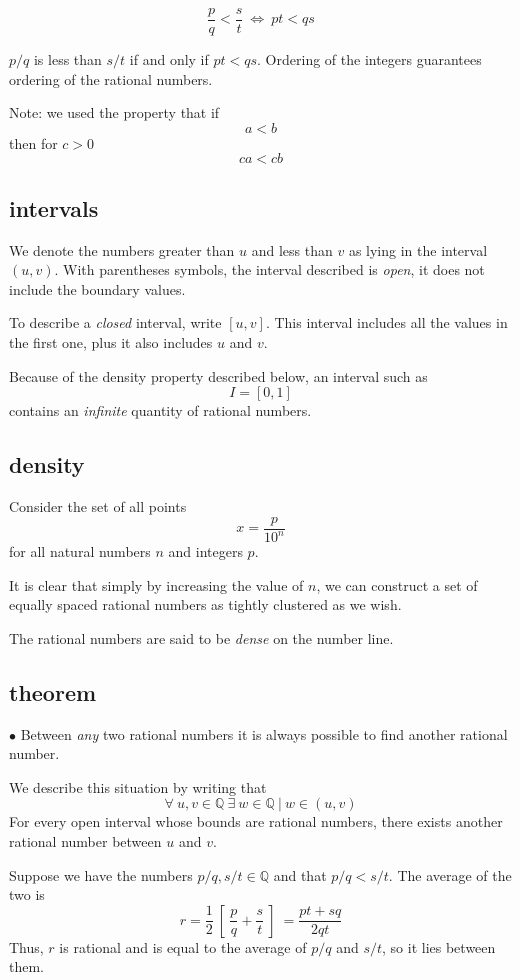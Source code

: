 \documentclass[11pt, oneside]{article}
\begin{document}
\[ \frac{p}{q} < \frac{s}{t} \ \iff \ pt < qs \]

$p/q$ is less than $s/t$ if and only if $pt < qs$.  Ordering of the integers guarantees ordering of the rational numbers.

Note:  we used the property that if
\[ a < b \]
then for $c > 0$
\[ ca < cb \]

\subsection*{intervals}
We denote the numbers greater than $u$ and less than $v$ as lying in the interval $(u,v)$.  With parentheses symbols, the interval described is \emph{open}, it does not include the boundary values.

To describe a \emph{closed} interval, write $[u,v]$.  This interval includes all the values in the first one, plus it also includes $u$ and $v$.

Because of the density property described below, an interval such as
\[ I = [0,1] \]
contains an \emph{infinite} quantity of rational numbers.

\subsection*{density}
Consider the set of all points
\[ x = \frac{p}{10^n} \]
for all natural numbers $n$ and integers $p$.

It is clear that simply by increasing the value of $n$, we can construct a set of equally spaced rational numbers as tightly clustered as we wish.

The rational numbers are said to be \emph{dense} on the number line.  

\subsection*{theorem}

$\bullet$  Between \emph{any} two rational numbers it is always possible to find another rational number.  

We describe this situation by writing that
\[ \forall \ u,v \in \mathbb{Q} \ \exists \ w \in \mathbb{Q} \ | \ w \in (u,v) \]
For every open interval whose bounds are rational numbers, there exists another rational number between $u$ and $v$.

Suppose we have the numbers $p/q, s/t \in \mathbb{Q}$ and that $p/q < s/t$.  The average of the two is
\[ r = \frac{1}{2} \ [ \  \frac{p}{q} + \frac{s}{t} \ ] \ = \frac{pt+sq}{2qt} \]
Thus, $r$ is rational and is equal to the average of $p/q$ and $s/t$, so it lies between them.  
\end{document}
